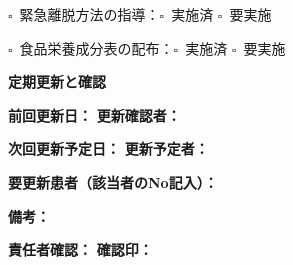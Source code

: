 \documentclass[a4paper,12pt]{jarticle}
\newcommand{\checkbox}{$\square$\ }
\newcommand{\underlinespace}[1]{\underline{\hspace{#1}}}
\begin{document}
\vspace{3mm}

\noindent
\checkbox 緊急離脱方法の指導：\checkbox 実施済 \quad \checkbox 要実施

\vspace{3mm}

\noindent
\checkbox 食品栄養成分表の配布：\checkbox 実施済 \quad \checkbox 要実施

\vspace{8mm}

\begin{center}
\textbf{\large 定期更新と確認}
\end{center}

\vspace{3mm}

\noindent
\textbf{前回更新日：} \underlinespace{4cm} \quad \textbf{更新確認者：} \underlinespace{4cm}

\vspace{3mm}

\noindent
\textbf{次回更新予定日：} \underlinespace{4cm} \quad \textbf{更新予定者：} \underlinespace{4cm}

\vspace{3mm}

\noindent
\textbf{要更新患者（該当者のNo記入）：} \underlinespace{10cm}

\vspace{3mm}

\noindent
\textbf{備考：}

\vspace{2mm}

\noindent
\underlinespace{13cm}

\vspace{2mm}

\noindent
\underlinespace{13cm}

\vspace{3mm}

\noindent
\textbf{責任者確認：} \underlinespace{4cm} \quad \textbf{確認印：} \underlinespace{3cm}
\end{document}
